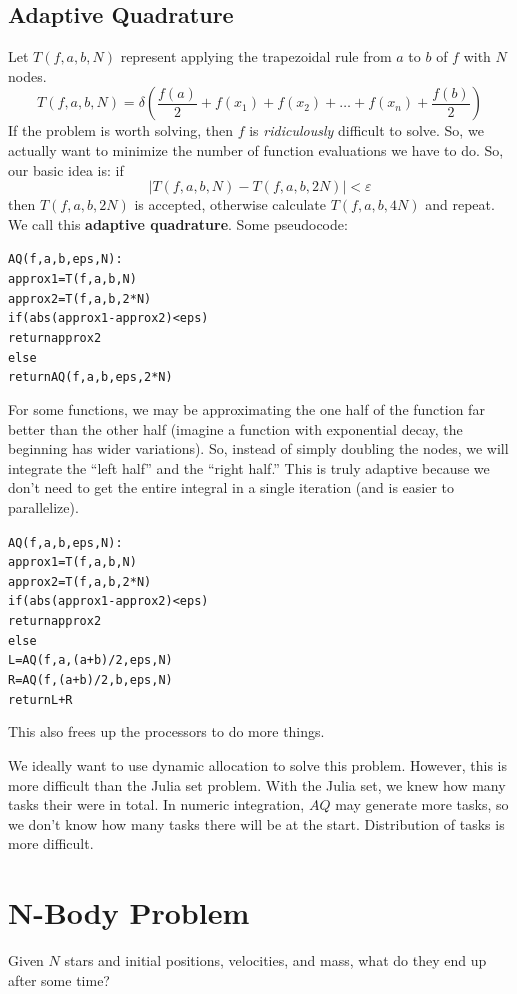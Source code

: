 \documentclass[12pt]{article}
\makeatletter
\numberwithin{equation}{section}
\newcommand{\abs}[1]{\lvert#1\rvert} %
\let\old@epsilon\epsilon	%
\let\old@varepsilon\varepsilon
\let\epsilon\old@varepsilon
\let\varepsilon\old@epsilon
\theoremstyle{theorem}
\theoremstyle{definition}
\theoremstyle{remark}
\makeatother
\begin{document}
\subsection{Adaptive Quadrature}
Let $T(f, a, b, N)$ represent applying the trapezoidal rule from $a$ to $b$ of $f$ with $N$ nodes.
\begin{equation}
T(f, a, b, N) = \delta(\frac{f(a)}{2} + f(x_1) + f(x_2) + \dots + f(x_n) + \frac{f(b)}{2})
\end{equation}
If the problem is worth solving, then $f$ is \textit{ridiculously} difficult to solve.  So, we actually want to minimize the number of function evaluations we have to do.  So, our basic idea is: if
\begin{equation}
\abs{T(f, a, b, N) - T(f, a, b, 2N)} < \epsilon
\end{equation}
then $T(f, a, b, 2N)$ is accepted, otherwise calculate $T(f, a, b, 4N)$ and repeat.  We call this \textbf{adaptive quadrature}. Some pseudocode:
\begin{alltt}
AQ(f, a, b, eps, N):
  approx1 = T(f, a, b, N)
  approx2 = T(f, a, b, 2*N)
  if(abs(approx1 - approx2) < eps) 
    return approx2
  else
    return AQ(f, a, b, eps, 2*N)
\end{alltt}
For some functions, we may be approximating the one half of the function far better than the other half (imagine a function with exponential decay, the beginning has wider variations).  So, instead of simply doubling the nodes, we will integrate the ``left half'' and the ``right half.''  This is truly adaptive because we don't need to get the entire integral in a single iteration (and is easier to parallelize).
\begin{alltt}
AQ(f, a, b, eps, N):
  approx1 = T(f, a, b, N)
  approx2 = T(f, a, b, 2*N)
  if(abs(approx1 - approx2) < eps) 
    return approx2
  else
    L = AQ(f, a, (a+b)/2, eps, N)
    R = AQ(f, (a+b)/2, b, eps, N)
    return L + R
\end{alltt}
This also frees up the processors to do more things.

We ideally want to use dynamic allocation to solve this problem.  However, this is more difficult than the Julia set problem.  With the Julia set, we knew how many tasks their were in total.  In numeric integration, $AQ$ may generate more tasks, so we don't know how many tasks there will be at the start.  Distribution of tasks is more difficult.

\section{N-Body Problem}
Given $N$ stars and initial positions, velocities, and mass, what do they end up after some time?
\end{document}
